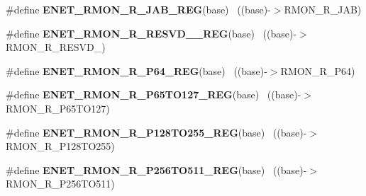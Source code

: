 \begin{DoxyCompactItemize}
\item 
\hypertarget{group___e_n_e_t___register___accessor___macros_ga053a2866858867b30ba7cf8f246af068}{}\#define {\bfseries E\+N\+E\+T\+\_\+\+R\+M\+O\+N\+\_\+\+R\+\_\+\+J\+A\+B\+\_\+\+R\+E\+G}(base)                            ~((base)-\/$>$R\+M\+O\+N\+\_\+\+R\+\_\+\+J\+A\+B)\label{group___e_n_e_t___register___accessor___macros_ga053a2866858867b30ba7cf8f246af068}

\item 
\hypertarget{group___e_n_e_t___register___accessor___macros_gaefae9e1b973aed508b63791c7fff8460}{}\#define {\bfseries E\+N\+E\+T\+\_\+\+R\+M\+O\+N\+\_\+\+R\+\_\+\+R\+E\+S\+V\+D\+\_\+\_\+\+R\+E\+G}(base)                    ~((base)-\/$>$R\+M\+O\+N\+\_\+\+R\+\_\+\+R\+E\+S\+V\+D\+\_)\label{group___e_n_e_t___register___accessor___macros_gaefae9e1b973aed508b63791c7fff8460}

\item 
\hypertarget{group___e_n_e_t___register___accessor___macros_gaa061909d8011e1fca73fbe7e558e3c23}{}\#define {\bfseries E\+N\+E\+T\+\_\+\+R\+M\+O\+N\+\_\+\+R\+\_\+\+P64\+\_\+\+R\+E\+G}(base)                            ~((base)-\/$>$R\+M\+O\+N\+\_\+\+R\+\_\+\+P64)\label{group___e_n_e_t___register___accessor___macros_gaa061909d8011e1fca73fbe7e558e3c23}

\item 
\hypertarget{group___e_n_e_t___register___accessor___macros_gad3a8106816bd2e0cd1625db3f97ab870}{}\#define {\bfseries E\+N\+E\+T\+\_\+\+R\+M\+O\+N\+\_\+\+R\+\_\+\+P65\+T\+O127\+\_\+\+R\+E\+G}(base)                  ~((base)-\/$>$R\+M\+O\+N\+\_\+\+R\+\_\+\+P65\+T\+O127)\label{group___e_n_e_t___register___accessor___macros_gad3a8106816bd2e0cd1625db3f97ab870}

\item 
\hypertarget{group___e_n_e_t___register___accessor___macros_ga0bcd923adfbbdb61be89298acf3555c1}{}\#define {\bfseries E\+N\+E\+T\+\_\+\+R\+M\+O\+N\+\_\+\+R\+\_\+\+P128\+T\+O255\+\_\+\+R\+E\+G}(base)                ~((base)-\/$>$R\+M\+O\+N\+\_\+\+R\+\_\+\+P128\+T\+O255)\label{group___e_n_e_t___register___accessor___macros_ga0bcd923adfbbdb61be89298acf3555c1}

\item 
\hypertarget{group___e_n_e_t___register___accessor___macros_ga4d961cd0219633b965768ec5055a86af}{}\#define {\bfseries E\+N\+E\+T\+\_\+\+R\+M\+O\+N\+\_\+\+R\+\_\+\+P256\+T\+O511\+\_\+\+R\+E\+G}(base)                ~((base)-\/$>$R\+M\+O\+N\+\_\+\+R\+\_\+\+P256\+T\+O511)\label{group___e_n_e_t___register___accessor___macros_ga4d961cd0219633b965768ec5055a86af}


\end{DoxyCompactItemize}
